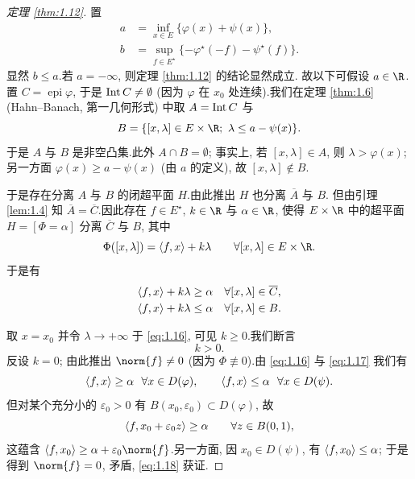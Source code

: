 \begin{proof}[定理 \ref{thm:1.12}]
置
\begin{align*}
a &= \inf_{x\in E}\{\varphi(x)+\psi(x)\},\\
b &= \sup_{f\in E^\star}\{-\varphi^\star(-f)-\psi^\star(f)\}.
\end{align*}
显然 $b\le a$.若 $a=-\infty$, 则定理  \ref{thm:1.12} 的结论显然成立.
故以下可假设 $a\in\R$.置 $C=\operatorname{epi}\varphi$, 于是 $\operatorname{Int} C\ne\emptyset$
(因为 $\varphi$ 在 $x_0$ 处连续).我们在定理  \ref{thm:1.6} (Hahn--Banach,
第一几何形式) 中取 $A=\operatorname{Int} C$ 与
\begin{equation*}
B=\{[x,\lambda]\in E\times\R;\ \lambda\le a-\psi(x)\}.
\end{equation*}
于是 $A$ 与 $B$ 是非空凸集.此外 $A\cap B=\emptyset$; 事实上, 若
$[x,\lambda]\in A$, 则 $\lambda>\varphi(x)$; 另一方面 $\varphi(x)\ge a-\psi(x)$
(由 $a$ 的定义), 故 $[x,\lambda]\notin B$.

于是存在分离 $A$ 与 $B$ 的闭超平面 $H$.由此推出 $H$ 也分离 $\overline{A}$ 与 $B$.
但由引理  \ref{lem:1.4} 知 $\overline{A}=\overline{C}$.因此存在 $f\in E^\star$, $k\in\R$ 与 $\alpha\in\R$, 使得 $E\times\R$ 中的超平面 $H=[\Phi=\alpha]$ 分离
$\overline{C}$ 与 $B$, 其中
\begin{equation*}
\Phi([x,\lambda])=\dual{f}{x}+k\lambda\qquad \forall[x,\lambda]\in E\times\R.
\end{equation*}
于是有
\begin{align}
\left\langle f,x\right\rangle+k\lambda &\ge \alpha && \forall[x,\lambda]\in\overline{C},
  \label{eq:1.16}\\
\left\langle f,x\right\rangle+k\lambda &\le \alpha && \forall[x,\lambda]\in B.
  \label{eq:1.17}
\end{align}

取 $x=x_0$ 并令 $\lambda\to+\infty$ 于 \eqref{eq:1.16}, 可见 $k\ge 0$.我们断言
\begin{equation}
k>0.
  \label{eq:1.18}
\end{equation}
反设 $k=0$; 由此推出 $\norm{f}\ne 0$ (因为 $\Phi\not\equiv 0$).由 \eqref{eq:1.16}
与 \eqref{eq:1.17} 我们有
\begin{equation*}
\left\langle f,x\right\rangle\ge\alpha\ \ \forall x\in D(\varphi),\qquad
\left\langle f,x\right\rangle\le\alpha\ \ \forall x\in D(\psi).
\end{equation*}
但对某个充分小的 $\varepsilon_0>0$ 有 $B(x_0,\varepsilon_0)\subset D(\varphi)$, 故
\begin{equation*}
\left\langle f,x_0+\varepsilon_0z\right\rangle\ge\alpha\qquad \forall z\in B(0,1),
\end{equation*}
这蕴含 $\dual{f}{x_0}\ge\alpha+\varepsilon_0\norm{f}$.另一方面, 因
$x_0\in D(\psi)$, 有 $\left\langle f,x_0\right\rangle\le\alpha$; 于是得到 $\norm{f}=0$, 矛盾,
\eqref{eq:1.18} 获证.


\end{proof}
